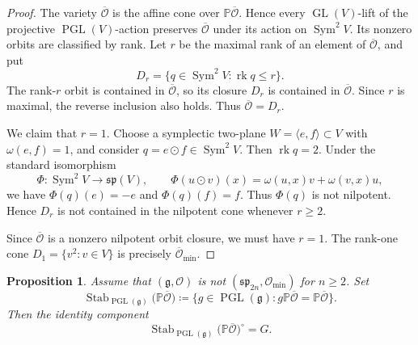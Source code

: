 \documentclass[10pt,a4paper]{amsart}
\newtheorem{proposition}[theorem]{Proposition}
\DeclareMathOperator{\rk}{rk}
\DeclareMathOperator{\Sym}{Sym}
\begin{document}
\begin{proof}
The variety $\overline{\mathcal O}$ is the affine cone over
$\mathbb P\overline{\mathcal O}$.
Hence every $\operatorname{GL}(V)$-lift of the projective
$\operatorname{PGL}(V)$-action preserves $\overline{\mathcal O}$ under
its action on $\Sym^2V$.
Its nonzero orbits are classified by rank.
Let $r$ be the maximal rank of an element of $\overline{\mathcal O}$,
and put
\[
D_r=\{q\in\Sym^2V:\rk q\leq r\}.
\]
The rank-$r$ orbit is contained in $\overline{\mathcal O}$, so its
closure $D_r$ is contained in $\overline{\mathcal O}$.
Since $r$ is maximal, the reverse inclusion also holds.
Thus $\overline{\mathcal O}=D_r$.

We claim that $r=1$.
Choose a symplectic two-plane $W=\langle e,f\rangle\subset V$ with
$\omega(e,f)=1$, and consider $q=e\odot f\in\Sym^2V$.
Then $\rk q=2$.
Under the standard isomorphism
\[
\Phi:\Sym^2V\longrightarrow\mathfrak{sp}(V),
\qquad
\Phi(u\odot v)(x)=\omega(u,x)v+\omega(v,x)u,
\]
we have $\Phi(q)(e)=-e$ and $\Phi(q)(f)=f$.
Thus $\Phi(q)$ is not nilpotent.
Hence $D_r$ is not contained in the nilpotent cone whenever $r\geq2$.

Since $\overline{\mathcal O}$ is a nonzero nilpotent orbit closure, we
must have $r=1$. The rank-one cone
$D_1=\{v^2:v\in V\}$ is precisely
$\overline{\mathcal O}_{\min}$.
\end{proof}

\begin{proposition}\label{prop:projective-stabilizer}
Assume that
$(\mathfrak g,\mathcal O)$ is not
$(\mathfrak{sp}_{2n},\mathcal O_{\min})$ for $n\geq2$.
Set
\[
\operatorname{Stab}_{\operatorname{PGL}(\mathfrak g)}
\bigl(\mathbb P\overline{\mathcal O}\bigr)
\coloneqq
\{g\in\operatorname{PGL}(\mathfrak g):
g\mathbb P\overline{\mathcal O}
=\mathbb P\overline{\mathcal O}\}.
\]
Then the identity component
\[
\operatorname{Stab}_{\operatorname{PGL}(\mathfrak g)}
\bigl(\mathbb P\overline{\mathcal O}\bigr)^\circ
=G.
\]
\end{proposition}
\end{document}
